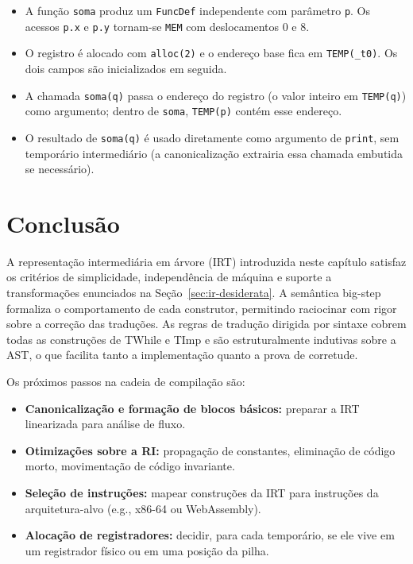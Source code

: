 \begin{itemize}
  \item A função \texttt{soma} produz um \texttt{FuncDef} independente com
    parâmetro \texttt{p}. Os acessos \texttt{p.x} e \texttt{p.y} tornam-se
    \texttt{MEM} com deslocamentos 0 e 8.
  \item O registro é alocado com \texttt{alloc(2)} e o endereço base fica
    em \texttt{TEMP(\_t0)}. Os dois campos são inicializados em seguida.
  \item A chamada \texttt{soma(q)} passa o endereço do registro (o valor
    inteiro em \texttt{TEMP(q)}) como argumento; dentro de \texttt{soma},
    \texttt{TEMP(p)} contém esse endereço.
  \item O resultado de \texttt{soma(q)} é usado diretamente como argumento
    de \texttt{print}, sem temporário intermediário (a canonicalização
    extrairia essa chamada embutida se necessário).
\end{itemize}

\section{Conclusão}\label{sec:ir-conclusao}

A representação intermediária em árvore (IRT) introduzida neste capítulo
satisfaz os critérios de simplicidade, independência de máquina e suporte a
transformações enunciados na Seção~\ref{sec:ir-desiderata}.
A semântica big-step formaliza o comportamento de cada construtor,
permitindo raciocinar com rigor sobre a correção das traduções.
As regras de tradução dirigida por sintaxe cobrem todas as construções de
TWhile e TImp e são estruturalmente indutivas sobre a AST, o que facilita
tanto a implementação quanto a prova de corretude.

Os próximos passos na cadeia de compilação são:
\begin{itemize}
  \item \textbf{Canonicalização e formação de blocos básicos:}
    preparar a IRT linearizada para análise de fluxo.
  \item \textbf{Otimizações sobre a RI:}
    propagação de constantes, eliminação de código morto,
    movimentação de código invariante.
  \item \textbf{Seleção de instruções:}
    mapear construções da IRT para instruções da arquitetura-alvo
    (e.g., x86-64 ou WebAssembly).
  \item \textbf{Alocação de registradores:}
    decidir, para cada temporário, se ele vive em um registrador físico
    ou em uma posição da pilha.
\end{itemize}
